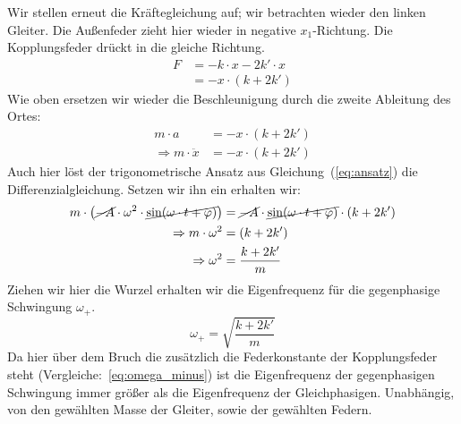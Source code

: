 \documentclass{article}
\begin{document}
                  Wir stellen erneut die Kräftegleichung auf; wir betrachten wieder den linken Gleiter.
                  Die Außenfeder zieht hier wieder in negative \(x_1\)-Richtung. Die Kopplungsfeder drückt in die gleiche Richtung.
                  \begin{equation}
                      \begin{aligned}
                          F & = -k \cdot x - 2 k' \cdot x \\
                            & = -x \cdot ( k + 2 k')
                      \end{aligned}
                  \end{equation}
                  Wie oben ersetzen wir wieder die Beschleunigung durch die zweite Ableitung des Ortes:
                  \begin{equation}
                      \begin{aligned}
                          m \cdot a                    & = -x \cdot ( k + 2 k') \\
                          \Rightarrow m \cdot \ddot{x} & = -x \cdot ( k + 2k')
                      \end{aligned}
                  \end{equation}
                  Auch hier löst der trigonometrische Ansatz aus Gleichung~(\ref{eq:ansatz}) die Differenzialgleichung. Setzen wir ihn ein erhalten wir:
                  \begin{equation}
                      \begin{aligned}
                          m \cdot \left( \cancel{-A} \cdot \omega^2 \cdot \cancel{ \sin( \omega \cdot t + \varphi ) } \right) & = \cancel{-A} \cdot \cancel{\sin( \omega \cdot t + \varphi )} \cdot ( k + 2 k' ) \\
                          \Rightarrow m \cdot \omega^2                                                                        & = (k + 2 k')                                                                     \\
                          \Rightarrow \omega^2                                                                                & = \frac{ k + 2k' }{ m }
                      \end{aligned}
                  \end{equation}
                  Ziehen wir hier die Wurzel erhalten wir die Eigenfrequenz für die gegenphasige Schwingung \( \omega_{+} \).
                  \begin{equation}\label{eq:omega_plus}
                      \omega_{+} = \sqrt{ \frac{ k + 2 k' }{m} }
                  \end{equation}
                  Da hier über dem Bruch die zusätzlich die Federkonstante der Kopplungsfeder steht (Vergleiche:~\ref{eq:omega_minus}) ist die Eigenfrequenz der gegenphasigen Schwingung
                  immer größer als die Eigenfrequenz der Gleichphasigen. Unabhängig, von den gewählten Masse der Gleiter, sowie der gewählten Federn.\label{Plus_größer_Minus}
\end{document}
